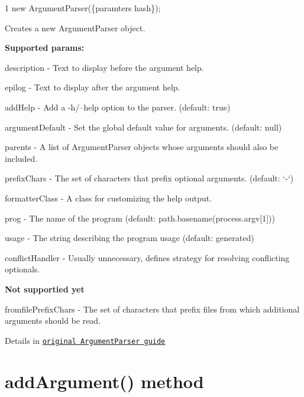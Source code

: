 \begin{DoxyCode}
1 new ArgumentParser(\{paramters hash\});
\end{DoxyCode}


Creates a new Argument\+Parser object.

{\bfseries Supported params\+:}


\begin{DoxyItemize}
\item {\ttfamily description} -\/ Text to display before the argument help.
\item {\ttfamily epilog} -\/ Text to display after the argument help.
\item {\ttfamily add\+Help} -\/ Add a -\/h/–help option to the parser. (default\+: true)
\item {\ttfamily argument\+Default} -\/ Set the global default value for arguments. (default\+: null)
\item {\ttfamily parents} -\/ A list of Argument\+Parser objects whose arguments should also be included.
\item {\ttfamily prefix\+Chars} -\/ The set of characters that prefix optional arguments. (default\+: ‘-\/‘)
\item {\ttfamily formatter\+Class} -\/ A class for customizing the help output.
\item {\ttfamily prog} -\/ The name of the program (default\+: {\ttfamily path.\+basename(process.\+argv\mbox{[}1\mbox{]})})
\item {\ttfamily usage} -\/ The string describing the program usage (default\+: generated)
\item {\ttfamily conflict\+Handler} -\/ Usually unnecessary, defines strategy for resolving conflicting optionals.
\end{DoxyItemize}

{\bfseries Not supportied yet}


\begin{DoxyItemize}
\item {\ttfamily fromfile\+Prefix\+Chars} -\/ The set of characters that prefix files from which additional arguments should be read.
\end{DoxyItemize}

Details in \href{http://docs.python.org/dev/library/argparse.html#argumentparser-objects}{\tt original Argument\+Parser guide}

\section*{add\+Argument() method }


